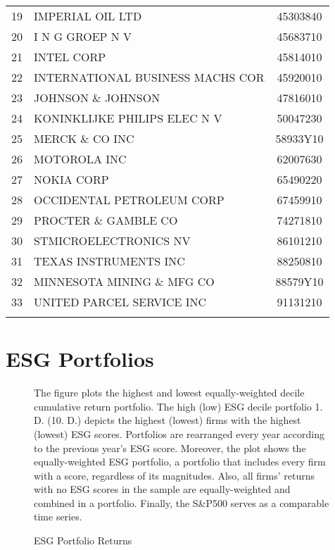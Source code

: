 \documentclass[11pt]{article}
\newcommand\fnote[1]{\captionsetup{font=small}\caption*{#1}}
\begin{document}
\begin{appendices}
\begin{table}[!htbp]
\begin{tabular}{@{\extracolsep{5pt}} clc}
		19 & IMPERIAL OIL LTD & 45303840 \\ 
		20 & I N G GROEP N V & 45683710 \\ 
		21 & INTEL CORP & 45814010 \\ 
		22 & INTERNATIONAL BUSINESS MACHS COR & 45920010 \\ 
		23 & JOHNSON \& JOHNSON & 47816010 \\ 
		24 & KONINKLIJKE PHILIPS ELEC N V & 50047230 \\ 
		25 & MERCK \& CO INC & 58933Y10 \\ 
		26 & MOTOROLA INC & 62007630 \\ 
		27 & NOKIA CORP & 65490220 \\ 
		28 & OCCIDENTAL PETROLEUM CORP & 67459910 \\ 
		29 & PROCTER \& GAMBLE CO & 74271810 \\ 
		30 & STMICROELECTRONICS NV & 86101210 \\ 
		31 & TEXAS INSTRUMENTS INC & 88250810 \\ 
		32 & MINNESOTA MINING \& MFG CO & 88579Y10 \\ 
		33 & UNITED PARCEL SERVICE INC & 91131210 \\ 
		\hline \\[-1.8ex] 
	\end{tabular} 
\end{table} 


\clearpage
\section{ESG Portfolios}
\label{app:ESGportfolios}




\begin{figure}[!htp]
	\centering
	\caption{ESG Portfolio Returns}
	\fnote{The figure plots the highest and lowest equally-weighted decile cumulative return portfolio. The high (low) ESG decile portfolio 1. D. (10. D.) depicts the highest (lowest) firms with the highest (lowest) ESG scores. Portfolios are rearranged every year according to the previous year's ESG score. Moreover, the plot shows the equally-weighted ESG portfolio, a portfolio that includes every firm with a score, regardless of its magnitudes. Also, all firms' returns with no ESG scores in the sample are equally-weighted and combined in a portfolio. Finally, the S\&P500 serves as a comparable time series.}
	\label{fig:esg_returns}
		\vspace{-0.5cm}
\end{figure}




\end{appendices}
\end{document}
